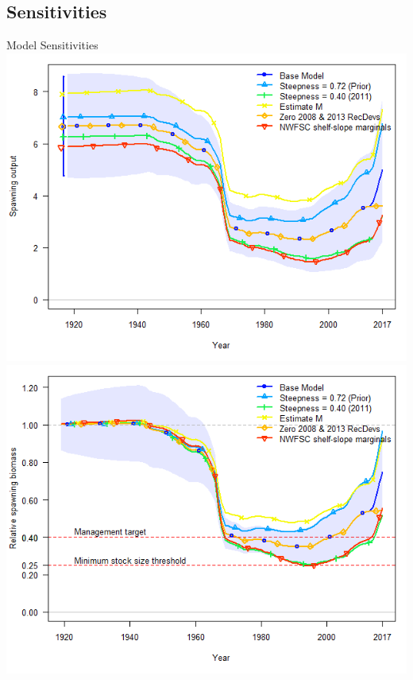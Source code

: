 \documentclass[pdf]{beamer}\usepackage[]{graphicx}\usepackage[]{color}
\begin{document}
\subsection{Sensitivities}
\begin{frame}{Model Sensitivities}
    \includegraphics[scale = 0.28]{figures/SSB_sensitivities_1.png}
    \includegraphics[scale = 0.28]{figures/Bratio_sensitivites_1.png}
\end{frame}
\end{document}
